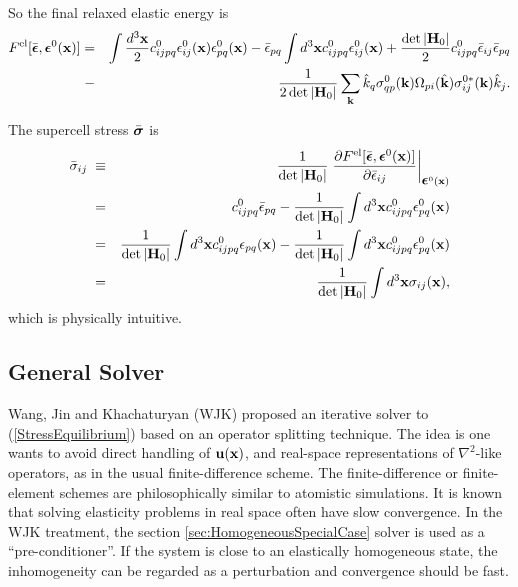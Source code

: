 \documentclass[12pt]{article}
\def\bmath#1{\mbox{\boldmath$#1$}}
\begin{document}
So the final relaxed elastic energy \cite{WangJK02} is 
\begin{eqnarray}
F^{\rm el}[\bar{\bmath{\epsilon}}, \bmath{\epsilon}^0({\bf x})] =&& 
 \int \frac{d^3{\bf x}}{2} c^0_{ijpq}
 \epsilon^0_{ij}({\bf x})  
 \epsilon^0_{pq}({\bf x}) - 
\bar{\epsilon}_{pq}\int d^3{\bf x} c^0_{ijpq} \epsilon^0_{ij}({\bf x}) 
+ 
\frac{\det|{\bf H}_0|}{2} c^0_{ijpq} \bar{\epsilon}_{ij} \bar{\epsilon}_{pq}
 \nonumber\\
-&& \frac{1}{2\det|{\bf H}_0|}\sum_{\bf k}
\hat{k}_q \sigma^0_{qp}({\bf k})
\Omega_{pi}(\hat{\bf k})\sigma^{0*}_{ij}({\bf k}) \hat{k}_j.
  \label{TotalElasticEnergyHomogeneousSolution}
\end{eqnarray}

The supercell stress $\bar{\bmath{\sigma}}$ is 
\begin{eqnarray}
 \bar{\sigma}_{ij} \;\equiv&& \frac{1}{\det|{\bf H}_0|}
 \left.\frac{\partial F^{\rm el}[\bar{\bmath{\epsilon}},
 \bmath{\epsilon}^0({\bf x})]}{\partial
 \bar{\epsilon}_{ij}}\right|_{\bmath{\epsilon}^0({\bf x})} \nonumber\\
=&&
 c^0_{ijpq} \bar{\epsilon}_{pq} - \frac{1}{\det|{\bf H}_0|} \int d^3{\bf x} c^0_{ijpq} \epsilon^0_{pq}({\bf x})\nonumber\\
=&&
 \frac{1}{\det|{\bf H}_0|} \int d^3{\bf x} 
c^0_{ijpq} \epsilon_{pq}({\bf x}) - \frac{1}{\det|{\bf H}_0|} \int d^3{\bf x} c^0_{ijpq} \epsilon^0_{pq}({\bf x}) \nonumber\\
 =&& \frac{1}{\det|{\bf H}_0|} \int d^3{\bf x} \sigma_{ij}({\bf x}),
 \label{SupercellVirialStressHomogeneousSolution}
\end{eqnarray}
which is physically intuitive.


\subsection{General Solver}

Wang, Jin and Khachaturyan (WJK) proposed an iterative solver to
(\ref{StressEquilibrium}) based on an operator splitting technique.
The idea is one wants to avoid direct handling of ${\bf u}({\bf x})$,
and real-space representations of $\nabla^2$-like operators, as in the
usual finite-difference scheme. The finite-difference or
finite-element schemes are philosophically similar to atomistic
simulations.  It is known that solving elasticity problems in real
space often have slow convergence. In the WJK treatment, the section
\ref{sec:HomogeneousSpecialCase} solver is used as a
``pre-conditioner''.  If the system is close to an elastically
homogeneous state, the inhomogeneity can be regarded as a perturbation
and convergence should be fast.
\end{document}
